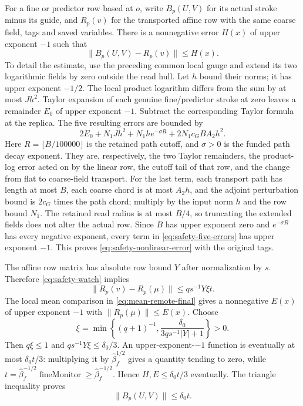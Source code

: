 For a fine or predictor row based at $o$, write $B_p(U,V)$ for its
actual stroke minus its guide, and $R_p(v)$ for the transported affine
row with the same coarse field, tags and saved variables. There is a
nonnegative error $H(x)$ of upper exponent $-1$ such that
\begin{equation}\label{eq:safety-nonlinear-error}
                      \|B_p(U,V)-R_p(v)\|\le H(x).
\end{equation}
To detail the estimate, use the preceding common local gauge and
extend its two logarithmic fields by zero outside the read hull.
Let $h$ bound their norms; it has upper exponent $-1/2$. The local
product logarithm differs from the sum by at most $Jh^2$. Taylor
expansion of each genuine fine/predictor stroke at zero leaves a
remainder $E_0$ of upper exponent $-1$. Subtract the corresponding
Taylor formula at the replica. The five resulting errors are bounded
by
\begin{equation}\label{eq:safety-five-errors}
  2E_0+N_1Jh^2+N_1h e^{-\sigma R}
                           +2N_1c_GB A_2h^2.
\end{equation}
Here $R=\lfloor B/100000\rfloor$ is the retained path cutoff, and
$\sigma>0$ is the funded path decay exponent. They are, respectively,
the two Taylor remainders, the product-log
error acted on by the linear row, the cutoff tail of that row, and
the change from flat to coarse-field transport. For the last term,
each transport path has length at most $B$, each coarse chord is at
most $A_2h$, and the adjoint perturbation bound is $2c_G$ times the
path chord; multiply by the input norm $h$ and the row bound $N_1$.
The retained read radius is at most $B/4$, so truncating the extended
fields does not alter the actual row. Since $B$ has upper exponent
zero and $e^{-\sigma R}$ has every negative exponent, every term in
\eqref{eq:safety-five-errors} has upper exponent $-1$. This proves
\eqref{eq:safety-nonlinear-error} with the original tags.

The affine row matrix has absolute row bound $Y$ after normalization
by $s$. Therefore \eqref{eq:safety-watch} implies
\begin{equation}\label{eq:safety-linear-error}
              \|R_p(v)-R_p(\mu)\|\le q s^{-1}Y\xi t.
\end{equation}
The local mean comparison in \eqref{eq:mean-remote-final} gives a
nonnegative $E(x)$ of upper exponent $-1$ with
$\|R_p(\mu)\|\le E(x)$. Choose
\begin{equation}\label{eq:safety-xi}
 \xi=\min\left\{(q+1)^{-1},
                 \frac{\delta_0}{3q s^{-1}|Y|+1}\right\}>0.
\end{equation}
Then $q\xi\le1$ and $q s^{-1}Y\xi\le\delta_0/3$.
An upper-exponent-$-1$ function is eventually at most
$\delta_0t/3$: multiplying it by $\widehat\beta_f^{1/2}$ gives a
quantity tending to zero, while
$t=\widehat\beta_f^{-1/2}\operatorname{fineMonitor}\ge
\widehat\beta_f^{-1/2}$. Hence $H,E\le\delta_0t/3$ eventually.
The triangle inequality proves
\begin{equation}\label{eq:safety-bill}
                         \|B_p(U,V)\|\le\delta_0t.
\end{equation}

